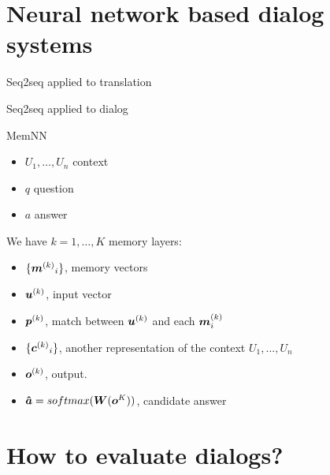 \documentclass[10pt]{beamer}
\begin{document}
\section{Neural network based dialog systems}

\begin{frame}{Seq2seq applied to translation}

\end{frame}

\begin{frame}{Seq2seq applied to dialog \cite{DBLP:journals/corr/VinyalsL15}}

\end{frame}


\begin{frame}{MemNN}
\begin{itemize}
\item $U_1, \dots, U_n$ context
\item $q$ question
\item $a$ answer
\end{itemize}

We have $k = 1, \dots, K$ memory layers: 

\begin{itemize}
\item $\{ {\bm{m}^{(k)}}_i\}$, memory vectors
\item $\bm{u}^{(k)}$, input vector
\item $\bm{p}^{(k)}$,  match between $\bm{u}^{(k)}$ and each $\bm{m}^{(k)}_i$
\item $\{ {\bm{c}^{(k)}}_i\}$, another representation of the context $U_1, ..., U_n$
\item $\bm{o}^{(k)}$, output.
\item $\bm{\hat{a}}= softmax(\bm{W}(\bm{o}^{K}))$, candidate answer
\end{itemize}
\end{frame}



\section{How to evaluate dialogs?}
\end{document}
